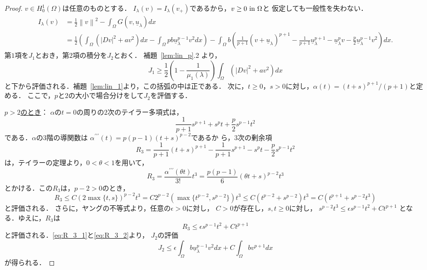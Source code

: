 \begin{proof}
 $v \in H_0^1(\Omega)$は任意のものとする．
 $I_\lambda(v) = I_\lambda(v_+)$であるから，$v \geq 0 ~\text{in}~ \Omega$と
 仮定しても一般性を失わない．
 \begin{align*}
  I_\lambda(v) &= \frac{1}{2} \left\| v \right\|^2 - \int_\Omega G(v,
  \underline{u}_\lambda)dx \\
  &= \frac{1}{2} \left( \int_\Omega \left( \lvert Dv \rvert^2 + a v^2
  \right) dx -\int_\Omega pb\underline{u}_\lambda^{p-1} v^2 dx
  \right)
  - \int_\Omega b \left( \frac{1}{p+1}(v +
  \underline{u}_\lambda)^{p+1} - \frac{1}{p+1}
  \underline{u}_\lambda^{p+1} - \underline{u}_\lambda^p v -
  \frac{p}{2} \underline{u}_\lambda^{p-1} v^2 \right) dx.
 \end{align*}
 第$1$項を$J_1$とおき，第$2$項の積分を$J_2$とおく．
 補題~\ref{lem:lin_p}.2 より，
 \begin{equation}
  J_1 \geq \frac{1}{2} \left( 1 - \frac{1}{\mu_1(\lambda)} \right)
   \int_\Omega \left( \lvert Dv \rvert^2 + a v^2 \right) dx \label{eq:J1}
 \end{equation}
 と下から評価される．補題~\ref{lem:lin_1}より，この括弧の中は正である．
 次に，$t \geq 0$，$s > 0$に対し，$\alpha(t) = (t+s)^{p+1}/(p+1)$と定める．
 ここで，$p$と$2$の大小で場合分けをして$J_2$を評価する．

 \underline{{$p > 2$}のとき}：
 $\alpha$の$t = 0$の周りの$2$次のテイラー多項式は，
 \[
 \frac{1}{p+1} s^{p+1} + s^p t + \frac{p}{2}s^{p-1}t^2
 \]
 である．$\alpha$の$3$階の導関数は
 $\alpha^{\prime\prime\prime}(t) = p(p-1)(t+s)^{p-2}$であるか
 ら，$3$次の剰余項
 \begin{equation}
  R_3 = \frac{1}{p+1}(t+s)^{p+1} - 
 \frac{1}{p+1} s^{p+1} - s^p t - \frac{p}{2}s^{p-1}t^2 \label{eq:R_3_1}
 \end{equation}
 は，テイラーの定理より，$0 < \theta < 1$を用いて，
 \[
  R_3 = \frac{\alpha^{\prime\prime\prime}(\theta t)}{3!} t^3 =
 \frac{p(p-1)}{6} (\theta t + s)^{p-2} t^3
 \]
 とかける．この$R_3$は，$p - 2 > 0$のとき，
 \begin{equation}  
  R_3  \leq C (2 \max \{ t, s \})^{p-2} t^3 
   = C 2^{p-2} ( \max \{ t^{p-2}, s^{p-2} \})t^3
   \leq  C ( t^{p-2} + s^{p-2} )t^3
   = C ( t^{p+1} + s^{p-2} t^3) \label{eq:R_3_2_pow}
 \end{equation}
 と評価される．
 さらに，ヤングの不等式より，任意の$\epsilon > 0$に対し，
 $C > 0$が存在し，$s, t \geq 0$に対し，
 $s^{p-2} t^3 \leq \epsilon s^{p-1} t^2 + C t^{p+1}$
 となる．ゆえに，$R_3$は
 \begin{equation}
  R_3 \leq \epsilon s^{p-1}t^2 + C t^{p+1} \label{eq:R_3_2}
 \end{equation}
 と評価される．\eqref{eq:R_3_1}と\eqref{eq:R_3_2}より，
 $J_2$の評価
 \begin{equation}
  J_2 \leq \epsilon \int_\Omega b \underline{u}_\lambda^{p-1} v^2 dx +
   C \int_\Omega b v^{p+1} dx \label{eq:J2}
 \end{equation}
 が得られる．


\end{proof}
